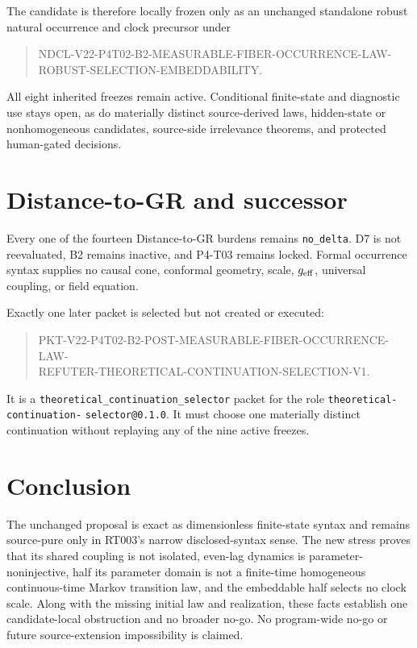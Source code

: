 \documentclass[11pt]{article}
\begin{document}
The candidate is therefore locally frozen only as an unchanged standalone
robust natural occurrence and clock precursor under
\begin{quote}
\small\ttfamily
NDCL-V22-P4T02-B2-MEASURABLE-FIBER-OCCURRENCE-LAW-\\
ROBUST-SELECTION-EMBEDDABILITY.
\end{quote}
All eight inherited freezes remain active. Conditional finite-state and
diagnostic use stays open, as do materially distinct source-derived laws,
hidden-state or nonhomogeneous candidates, source-side irrelevance theorems,
and protected human-gated decisions.

\section{Distance-to-GR and successor}

Every one of the fourteen Distance-to-GR burdens remains
\texttt{no\_delta}. D7 is not reevaluated, B2 remains inactive, and P4-T03
remains locked. Formal occurrence syntax supplies no causal cone, conformal
geometry, scale, $g_{\rm eff}$, universal coupling, or field equation.

Exactly one later packet is selected but not created or executed:
\begin{quote}
\small\ttfamily
PKT-V22-P4T02-B2-POST-MEASURABLE-FIBER-OCCURRENCE-LAW-\\
REFUTER-THEORETICAL-CONTINUATION-SELECTION-V1.
\end{quote}
It is a \texttt{theoretical\_continuation\_selector} packet for the role
\texttt{theoretical-continuation-}\linebreak
\texttt{selector@0.1.0}. It must choose one
materially distinct continuation without replaying any of the nine active
freezes.

\section{Conclusion}

The unchanged proposal is exact as dimensionless finite-state syntax and
remains source-pure only in RT003's narrow disclosed-syntax sense. The new
stress proves that its shared coupling is not isolated, even-lag dynamics is
parameter-noninjective, half its parameter domain is not a finite-time
homogeneous continuous-time Markov transition law, and the embeddable half
selects no clock scale. Along with the missing initial law and realization,
these facts establish one candidate-local obstruction and no broader no-go.
No program-wide no-go or future source-extension impossibility is claimed.
\end{document}
